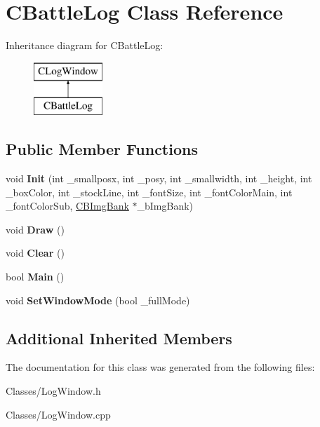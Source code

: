 \hypertarget{class_c_battle_log}{}\section{C\+Battle\+Log Class Reference}
\label{class_c_battle_log}
Inheritance diagram for C\+Battle\+Log\+:\begin{figure}[H]
\begin{center}
\leavevmode
\includegraphics[height=2.000000cm]{class_c_battle_log}
\end{center}
\end{figure}
\subsection*{Public Member Functions}
\begin{DoxyCompactItemize}
\item 
void {\bfseries Init} (int \+\_\+smallposx, int \+\_\+posy, int \+\_\+smallwidth, int \+\_\+height, int \+\_\+box\+Color, int \+\_\+stock\+Line, int \+\_\+font\+Size, int \+\_\+font\+Color\+Main, int \+\_\+font\+Color\+Sub, \hyperlink{class_c_b_img_bank}{C\+B\+Img\+Bank} $\ast$\+\_\+b\+Img\+Bank)\hypertarget{class_c_battle_log_a200b786cd4c633935b6d44bd369a75d9}{}\label{class_c_battle_log_a200b786cd4c633935b6d44bd369a75d9}

\item 
void {\bfseries Draw} ()\hypertarget{class_c_battle_log_a37c7068cca23e16b613b11e3ae99f575}{}\label{class_c_battle_log_a37c7068cca23e16b613b11e3ae99f575}

\item 
void {\bfseries Clear} ()\hypertarget{class_c_battle_log_a9e99e2aa439e3d4d5f06d504a707dafb}{}\label{class_c_battle_log_a9e99e2aa439e3d4d5f06d504a707dafb}

\item 
bool {\bfseries Main} ()\hypertarget{class_c_battle_log_ae67a2f8aa2e999ea752fb8bb161dfa79}{}\label{class_c_battle_log_ae67a2f8aa2e999ea752fb8bb161dfa79}

\item 
void {\bfseries Set\+Window\+Mode} (bool \+\_\+full\+Mode)\hypertarget{class_c_battle_log_a001126def515556172030e22f0f6b8af}{}\label{class_c_battle_log_a001126def515556172030e22f0f6b8af}

\end{DoxyCompactItemize}
\subsection*{Additional Inherited Members}


The documentation for this class was generated from the following files\+:\begin{DoxyCompactItemize}
\item 
Classes/Log\+Window.\+h\item 
Classes/Log\+Window.\+cpp\end{DoxyCompactItemize}
